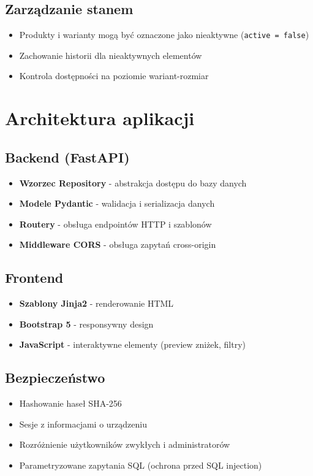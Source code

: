 \subsection*{Zarządzanie stanem}
\begin{itemize}
    \item Produkty i warianty mogą być oznaczone jako nieaktywne (\texttt{active = false})
    \item Zachowanie historii dla nieaktywnych elementów
    \item Kontrola dostępności na poziomie wariant-rozmiar
\end{itemize}

\section*{Architektura aplikacji}

\subsection*{Backend (FastAPI)}
\begin{itemize}
    \item \textbf{Wzorzec Repository} - abstrakcja dostępu do bazy danych
    \item \textbf{Modele Pydantic} - walidacja i serializacja danych
    \item \textbf{Routery} - obsługa endpointów HTTP i szablonów
    \item \textbf{Middleware CORS} - obsługa zapytań cross-origin
\end{itemize}

\subsection*{Frontend}
\begin{itemize}
    \item \textbf{Szablony Jinja2} - renderowanie HTML
    \item \textbf{Bootstrap 5} - responsywny design
    \item \textbf{JavaScript} - interaktywne elementy (preview zniżek, filtry)
\end{itemize}

\subsection*{Bezpieczeństwo}
\begin{itemize}
    \item Hashowanie haseł SHA-256
    \item Sesje z informacjami o urządzeniu
    \item Rozróżnienie użytkowników zwykłych i administratorów
    \item Parametryzowane zapytania SQL (ochrona przed SQL injection)
\end{itemize}

